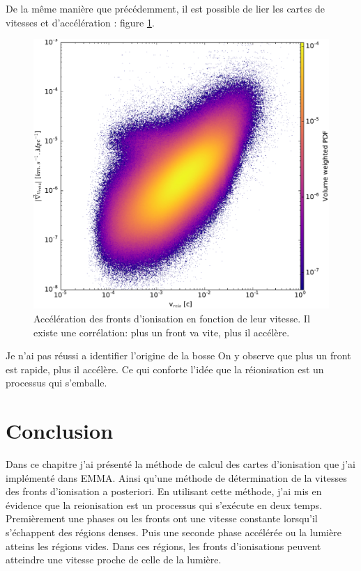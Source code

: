 

De la même manière que précédemment, il est possible de lier les cartes de vitesses et d'accélération : figure \ref{fig:accspeed}.

\begin{figure}
        \includegraphics[width=.95\linewidth]{img/04_mapreio/v_gradv_c1.pdf} 
        \caption[Évolution de l'accélération des fronts]{Accélération des fronts d'ionisation en fonction de leur vitesse.
        Il existe une corrélation: plus un front va vite, plus il accélère.
 		\label{fig:accspeed}}
\end{figure}


Je n'ai pas réussi a identifier l'origine de la bosse
On y observe que plus un front est rapide, plus il accélère.
Ce qui conforte l'idée que la réionisation est un processus qui s'emballe.


\section{Conclusion}
Dans ce chapitre j'ai présenté la méthode de calcul des cartes d'ionisation que j'ai implémenté dans EMMA.
Ainsi qu'une méthode de détermination de la vitesses des fronts d'ionisation a posteriori.
En utilisant cette méthode, j'ai mis en évidence que la reionisation est un processus qui s’exécute en deux temps.
Premièrement une phases ou les fronts ont une vitesse constante lorsqu'il s'échappent des régions denses.
Puis une seconde phase accélérée ou la lumière atteins les régions vides.
Dans ces régions, les fronts d'ionisations peuvent atteindre une vitesse proche de celle de la lumière.

